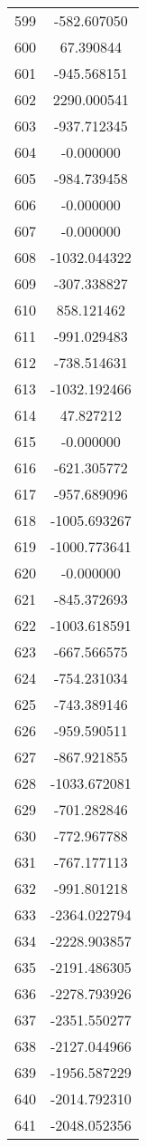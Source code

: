 \documentclass[12pt]{article}
\begin{document}
\begin{longtable}{@{}cc@{}}
599 & -582.607050 \\
600 & 67.390844 \\
601 & -945.568151 \\
602 & 2290.000541 \\
603 & -937.712345 \\
604 & -0.000000 \\
605 & -984.739458 \\
606 & -0.000000 \\
607 & -0.000000 \\
608 & -1032.044322 \\
609 & -307.338827 \\
610 & 858.121462 \\
611 & -991.029483 \\
612 & -738.514631 \\
613 & -1032.192466 \\
614 & 47.827212 \\
615 & -0.000000 \\
616 & -621.305772 \\
617 & -957.689096 \\
618 & -1005.693267 \\
619 & -1000.773641 \\
620 & -0.000000 \\
621 & -845.372693 \\
622 & -1003.618591 \\
623 & -667.566575 \\
624 & -754.231034 \\
625 & -743.389146 \\
626 & -959.590511 \\
627 & -867.921855 \\
628 & -1033.672081 \\
629 & -701.282846 \\
630 & -772.967788 \\
631 & -767.177113 \\
632 & -991.801218 \\
633 & -2364.022794 \\
634 & -2228.903857 \\
635 & -2191.486305 \\
636 & -2278.793926 \\
637 & -2351.550277 \\
638 & -2127.044966 \\
639 & -1956.587229 \\
640 & -2014.792310 \\
641 & -2048.052356 \\

\end{longtable}
\end{document}
